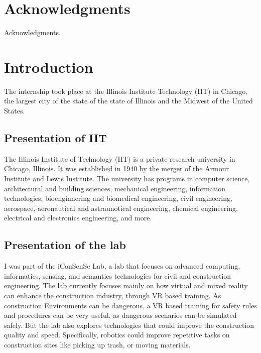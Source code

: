 \documentclass[12pt]{article}
\begin{document}
\newpage
\section*{Acknowledgments}

    Acknowledgments.
    
\newpage
\thispagestyle{empty}
\mbox{}
\newpage
\thispagestyle{empty}
{\small \tableofcontents}

\newpage
\thispagestyle{empty}
\mbox{}
\newpage

\section{Introduction}

    The internship took place at the Illinois Institute Technology (IIT) in Chicago, the largest city of the state of the state of Illinois and the Midwest of the United States.

    \subsection{Presentation of IIT}

    The Illinois Institute of Technology (IIT) is a private research university in Chicago, Illinois. It was established in 1940 by the merger of the Armour Institute and Lewis Institute. The university has programs in computer science, architectural and building sciences, mechanical engineering, information technologies, bioenginnering and biomedical engineering, civil engineering, aerospace, aeronautical and astraunotical engineering, chemical engineering, electrical and electronics engineering, and more.


    \subsection{Presentation of the lab}

    I was part of the iConSenSe Lab, a lab that focuses on advanced computing, informatics, sensing, and semantics technologies for civil and construction engineering. The lab currently focuses mainly on how virtual and mixed reality can enhance the construction industry, through VR based training. As construction Environments can be dangerous, a VR based training for safety rules and procedures can be very useful, as dangerous scenarios can be simulated safely.
    But the lab also explores technologies that could improve the construction quality and speed. Specifically, robotics could improve repetitive tasks on construction sites like picking up trash, or moving materials.
\end{document}
